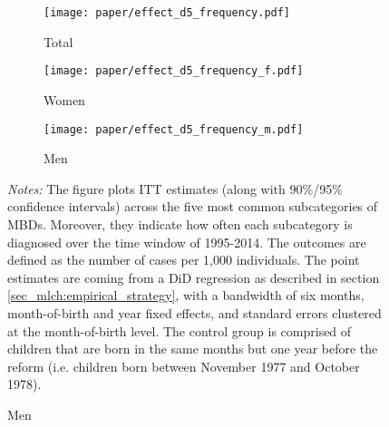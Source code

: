 \begin{landscape}
	\vspace*{\fill}
	\begin{figure}
		[H]\centering
		\caption{ITT effect for \textbf{subcategories of mental and behavioral disorders (pooled)}}\label{fig_mlch: ITT_d5_subcategories}
		\begin{subfigure}[h]{0.31\linewidth}\centering\caption{Total}
			\texttt{[image: paper/effect\_d5\_frequency.pdf]}
		\end{subfigure}
		\begin{subfigure}[h]{0.31\linewidth}\centering\caption{Women}
			\texttt{[image: paper/effect\_d5\_frequency\_f.pdf]}
		\end{subfigure}
		\begin{subfigure}[h]{0.31\linewidth}\centering\caption{Men}
			\texttt{[image: paper/effect\_d5\_frequency\_m.pdf]}
		\end{subfigure}
		\scriptsize
		\begin{minipage}{0.95\linewidth}
			\emph{Notes:} The figure plots ITT estimates (along with 90\%/95\% confidence intervals) across the five most common subcategories of MBDs. Moreover, they indicate how often each subcategory is diagnosed over the time window of 1995-2014. The outcomes are defined as the number of cases per 1,000 individuals. The point estimates are coming from a DiD regression as described in section \ref{sec_mlch:empirical_strategy}, with a bandwidth of six months, month-of-birth and year fixed effects, and standard errors clustered at the month-of-birth level. The control group is comprised of children that are born in the same months but one year before the reform (i.e. children born between November 1977 and October 1978).\newline
		\end{minipage}
	\end{figure}
	\vspace*{\fill}\clearpage
\end{landscape}
\restoregeometry 
